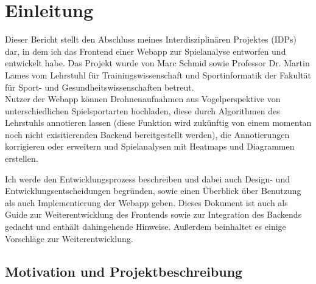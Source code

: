 \chapter{Einleitung}
Dieser Bericht stellt den Abschluss meines Interdisziplinären Projektes (IDPs) dar, in dem ich das Frontend einer Webapp zur Spielanalyse entworfen und entwickelt habe. Das Projekt wurde von Marc Schmid sowie Professor Dr. Martin Lames vom Lehrstuhl für Trainingswissenschaft und Sportinformatik der Fakultät für Sport- und Gesundheitswissenschaften betreut.\\
Nutzer der Webapp können Drohnenaufnahmen aus Vogelperspektive von unterschiedlichen Spielsportarten hochladen, diese durch Algorithmen des Lehrstuhls annotieren lassen (diese Funktion wird zukünftig von einem momentan noch nicht exisitierenden Backend bereitgestellt werden), die Annotierungen korrigieren oder erweitern und Spielanalysen mit Heatmaps und Diagrammen erstellen.

Ich werde den Entwicklungsprozess beschreiben und dabei auch Design- und Entwicklungsentscheidungen begründen, sowie einen Überblick über Benutzung als auch Implementierung der Webapp geben. Dieses Dokument ist auch als Guide zur Weiterentwicklung des Frontends sowie zur Integration des Backends gedacht und enthält dahingehende Hinweise. Außerdem beinhaltet es einige Vorschläge zur Weiterentwicklung.

\section{Motivation und Projektbeschreibung}

